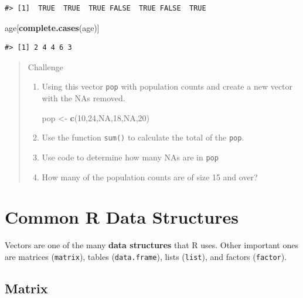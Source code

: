 \documentclass[
]{book}
\newenvironment{Shaded}{\begin{snugshade}}{\end{snugshade}}
\newcommand{\ConstantTok}[1]{\textcolor[rgb]{0.56,0.35,0.01}{#1}}
\newcommand{\DecValTok}[1]{\textcolor[rgb]{0.00,0.00,0.81}{#1}}
\newcommand{\FunctionTok}[1]{\textcolor[rgb]{0.13,0.29,0.53}{\textbf{#1}}}
\newcommand{\NormalTok}[1]{#1}
\newcommand{\OtherTok}[1]{\textcolor[rgb]{0.56,0.35,0.01}{#1}}
\begin{document}
\begin{verbatim}
#> [1]  TRUE  TRUE  TRUE FALSE  TRUE FALSE  TRUE
\end{verbatim}

\begin{Shaded}
\begin{Highlighting}[]
\NormalTok{age[}\FunctionTok{complete.cases}\NormalTok{(age)]}
\end{Highlighting}
\end{Shaded}

\begin{verbatim}
#> [1] 2 4 4 6 3
\end{verbatim}

\begin{quote}
Challenge

\begin{enumerate}
\def\labelenumi{\arabic{enumi}.}
\item
  Using this vector \texttt{pop} with population counts and create a new vector with the NAs
  removed.

\begin{Shaded}
\begin{Highlighting}[]
\NormalTok{pop }\OtherTok{\textless{}{-}} \FunctionTok{c}\NormalTok{(}\DecValTok{10}\NormalTok{,}\DecValTok{24}\NormalTok{,}\ConstantTok{NA}\NormalTok{,}\DecValTok{18}\NormalTok{,}\ConstantTok{NA}\NormalTok{,}\DecValTok{20}\NormalTok{)}
\end{Highlighting}
\end{Shaded}
\item
  Use the function \texttt{sum()} to calculate the total of the \texttt{pop}.
\item
  Use code to determine how many NAs are in \texttt{pop}
\item
  How many of the population counts are of size 15 and over?
\end{enumerate}
\end{quote}

\section{Common R Data Structures}\label{common-r-data-structures}

Vectors are one of the many \textbf{data structures} that R uses. Other important
ones are matrices (\texttt{matrix}), tables (\texttt{data.frame}), lists (\texttt{list}), and
factors (\texttt{factor}).

\subsection{Matrix}\label{matrix}
\end{document}
